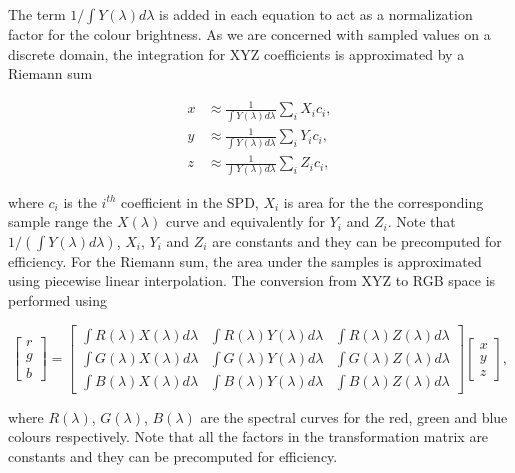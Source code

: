 The term $1 / \int Y(\lambda) d\lambda$ is added in each equation to act as a normalization factor for the colour brightness. 
As we are concerned with sampled values on a discrete domain, the integration for XYZ coefficients is approximated by a Riemann sum

\begin{equation}
\begin{split}
x &\approx \frac{1}{\int Y(\lambda) d\lambda} \sum_i X_i c_i, \\
y &\approx \frac{1}{\int Y(\lambda) d\lambda} \sum_i Y_i c_i, \\
z &\approx \frac{1}{\int Y(\lambda) d\lambda} \sum_i Z_i c_i,
\end{split}
\end{equation}

where $c_i$ is the $i^{th}$ coefficient in the SPD, $X_i$ is area for the the corresponding sample range the $X(\lambda)$ curve and equivalently for $Y_i$ and $Z_i$.
Note that $1 / \left(\int Y(\lambda) d\lambda \right)$, $X_i$, $Y_i$ and $Z_i$ are constants and they can be precomputed for efficiency.
For the Riemann sum, the area under the samples is approximated using piecewise linear interpolation.
The conversion from XYZ to RGB space is performed using

\begin{equation}
\begin{bmatrix}
r \\
g \\
b
\end{bmatrix}
 = 
\begin{bmatrix}
\int R(\lambda) X(\lambda) d\lambda & \int R(\lambda) Y(\lambda) d\lambda & \int R(\lambda) Z(\lambda) d\lambda \\
\int G(\lambda) X(\lambda) d\lambda & \int G(\lambda) Y(\lambda) d\lambda & \int G(\lambda) Z(\lambda) d\lambda \\
\int B(\lambda) X(\lambda) d\lambda & \int B(\lambda) Y(\lambda) d\lambda & \int B(\lambda) Z(\lambda) d\lambda
\end{bmatrix}
\begin{bmatrix}
x \\
y \\
z
\end{bmatrix},
\end{equation}

where $R(\lambda)$, $G(\lambda)$, $B(\lambda)$ are the spectral curves for the red, green and blue colours respectively.
Note that all the factors in the transformation matrix are constants and they can be precomputed for efficiency.

